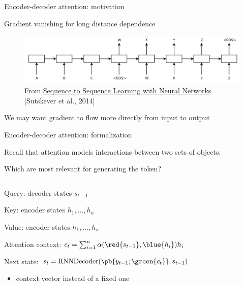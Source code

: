 \documentclass[usenames,dvipsnames,notes,11pt,aspectratio=169,hyperref={colorlinks=true, linkcolor=blue}]{beamer}
\begin{document}
\begin{frame}
    {Encoder-decoder attention: motivation}

    Gradient vanishing for long distance dependence

    \begin{figure}
        \includegraphics[height=2.5cm]{figures/s2s-ilya}
        \caption{From \href{https://arxiv.org/abs/1409.3215}{Sequence to Sequence Learning with Neural Networks} [Sutskever et al., 2014]}
    \end{figure}

    \pause
    We may want gradient to flow more directly from input to output
\end{frame}

\begin{frame}
    {Encoder-decoder attention: formalization}

    Recall that attention models interactions between two sets of objects:

    Which  are most relevant for generating the  token? 

    \pause\medskip
    \begin{columns}
        \begin{column}{0.6\textwidth}
    \begin{wideitemize}[<+->]
        \item Query: decoder states $s_{t-1}$
        \item Key: encoder states $h_1,\ldots,h_n$
        \item Value: encoder states $h_1,\ldots,h_n$
        \item Attention context: $c_t = \sum_{i=1}^n \alpha(\red{s_{t-1}}, \blue{h_i}) h_i$
        \item Next state: $s_t = \mathrm{RNNDecoder}(\pb{y_{t-1};\green{c_t}}, s_{t-1})$
            \begin{itemize}
                \item {} context vector instead of a fixed one
            \end{itemize}
    \end{wideitemize}
        \end{column}
        \begin{column}{0.4\textwidth}
        \end{column}
    \end{columns}
\end{frame}
\end{document}
